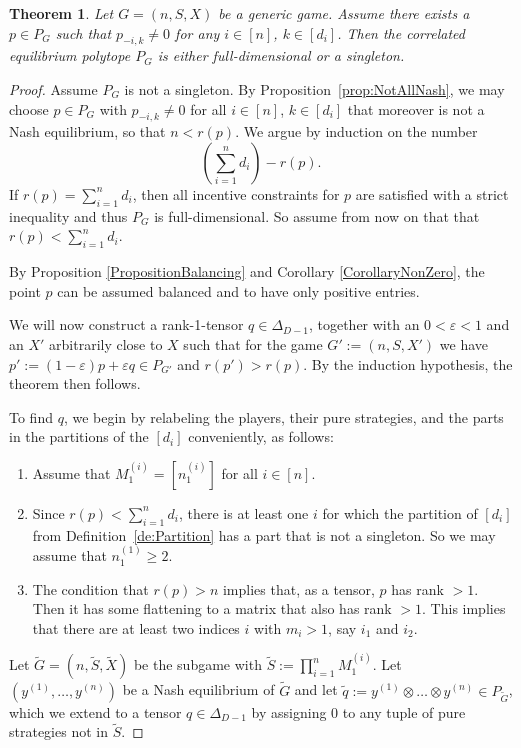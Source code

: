 \documentclass[11pt]{amsart}
\newtheorem{theorem}{Theorem}[section]
\theoremstyle{definition}
\numberwithin{subcase}{case}
\renewcommand{\tilde}[1]{\widetilde{#1}}
\begin{document}
\begin{theorem}
\label{TheoremFullOrSingleton}
Let $G=(n,S,X)$ be a generic game. Assume there exists a $p \in P_G$ such that $p_{-i,k} \neq 0$ for any $i \in [n]$, $k \in [d_i]$. Then the correlated equilibrium polytope $P_G$ is either full-dimensional or a singleton.     
\end{theorem}
\begin{proof}
Assume $P_G$ is not a singleton. By Proposition~\ref{prop:NotAllNash}, we may choose $p \in P_G$ with $p_{-i,k} \neq 0$ for all $i \in [n]$, $k \in [d_i]$ that moreover is not a Nash equilibrium, so that $n<r(p)$. 
We argue by induction on the number \[
\left(\sum_{i=1}^n d_i\right)-r(p).\] 
If $r(p)=\sum_{i=1}^n d_i$, then all
incentive constraints for $p$ are satisfied with a strict inequality
and thus $P_G$ is full-dimensional. So assume from now on that that $r(p)<\sum_{i=1}^n d_i$. 

By Proposition \ref{PropositionBalancing} and Corollary
\ref{CorollaryNonZero}, the point $p$ can be assumed balanced and to
have only positive entries. 

We will now construct
a rank-1-tensor $q \in \Delta_{D-1}$, together with an $0<\varepsilon<1$
and an $X'$ arbitrarily close to $X$ such that for the game
$G':=(n,S,X')$ we have $p':=(1-\varepsilon)p
+ \varepsilon q \in P_{G'}$ and $r(p')>r(p).$ By
the induction hypothesis, the theorem then follows.

To find $q$, we begin by relabeling the players, their pure strategies, and the
parts in the partitions of the $[d_i]$ conveniently, as follows:
\begin{enumerate}
    \item Assume that $M^{(i)}_1=[n_1^{(i)}]$ for all $i \in [n]$. 
    \item Since $r(p)< \sum_{i=1}^n d_i$, there is at least one $i$
    for which the partition of $[d_i]$ from
    Definition~\ref{de:Partition} has a part that is not a
    singleton. So we may assume that $n_1^{(1)} \geq 2$.
    \item The condition that $r(p)>n$ implies that, as a tensor, $p$
    has rank $>1$. Then it has some flattening to a matrix that also
    has rank $>1$. This implies that there are at least two indices
    $i$ with $m_{i}>1$, say $i_1$ and $i_2$. 
\end{enumerate}

Let $\tilde{G}=(n,\tilde{S},\tilde{X})$ be the subgame with
$\tilde{S}:=\prod_{i=1}^n M^{(i)}_1$. Let $(y^{(1)},\dots, y^{(n)})$
be a Nash equilibrium of $\tilde{G}$ and let $\tilde{q}:=y^{(1)}
\otimes \dots \otimes y^{(n)} \in P_{\tilde{G}}$, which we extend to a
tensor $q \in \Delta_{D-1}$ by assigning $0$ to any tuple of pure
strategies not in $\tilde{S}$. 


\end{proof}
\end{document}
